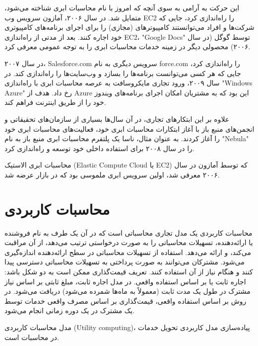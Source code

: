 \documentclass{book}
\begin{document}
            این حرکت به آرامی به سوی آنچه که امروز با نام محاسبات ابری شناخته می‌شود، متمایل شد. در سال ۲۰۰۶، آمازون سرویس وب EC2 را راه‌اندازی کرد، جایی که شرکت‌ها و افراد می‌توانستند کامپیوترهای (مجازی) را برای اجرای برنامه‌های کامپیوتری خود اجاره کنند. بعد از مدتی از راه‌اندازی EC2، "Google Docs" توسط گوگل (در سال ۲۰۰۶) محصولی دیگر در زمینه خدمات محاسبات ابری را به توجه عمومی معرفی کرد.

            در سال ۲۰۰۷، Salesforce.com سرویس دیگری به نام force.com را راه‌اندازی کرد، جایی که هر کسی می‌توانست برنامه‌ها را بسازد و وب‌سایت‌ها را راه‌اندازی کند. در سال ۲۰۰۹، ورود تجاری مایکروسافت به عرصه محاسبات ابری با راه‌اندازی "Windows Azure" رخ داد. هدف از Azure این بود که به مشتریان امکان اجرای برنامه‌های ویندوز خود را از طریق اینترنت فراهم کند.

            علاوه بر این ابتکارهای تجاری، در آن سال‌ها بسیاری از سازمان‌های تحقیقاتی و انجمن‌های منبع باز با آغاز ابتکارات محاسبات ابری خود، فعالیت‌های محاسبات ابری خود را آغاز کردند. به عنوان مثال، ناسا یک پلتفرم محاسبات ابری منبع باز به نام "Nebula" را در سال ۲۰۰۸ برای استفاده داخلی خود توسعه و راه‌اندازی کرد.

            \begin{addinfo}
                
                محاسبات ابری الاستیک (Elastic Compute Cloud یا EC2) که توسط آمازون در سال ۲۰۰۶ معرفی شد، اولین سرویس ابری ملموسی بود که در بازار عرضه شد.

            \end{addinfo}

        \section{محاسبات کاربردی}

            محاسبات کاربردی یک مدل تجاری محاسباتی است که در آن یک طرف به نام فروشنده یا ارائه‌دهنده، تسهیلات محاسباتی را به صورت درخواستی ترتیب می‌دهد، از آن مراقبت می‌کند، و ارائه می‌دهد. استفاده از تسهیلات محاسباتی در سطح ارائه‌دهنده اندازه‌گیری می‌شود. مشترکان می‌توانند به صورت پرداختی به تسهیلات محاسباتی دسترسی پیدا کنند و هنگام نیاز از آن استفاده کنند. تعریف قیمت‌گذاری ممکن است به دو شکل باشد: اجاره ثابت یا بر اساس استفاده واقعی. در مدل اجاره ثابت، مبلغ ثابتی بر اساس نیاز مشترک در طول یک مدت ثابت (معمولاً به ماه‌ها شمرده می‌شود) دریافت می‌شود. در روش بر اساس استفاده واقعی، قیمت‌گذاری بر اساس مصرف واقعی خدمات توسط یک مشترک در یک دوره زمانی انجام می‌شود.

            \begin{addinfo}
                
                مدل محاسبات کاربردی (Utility computing)، پیاده‌سازی مدل کاربردی تحویل خدمات در محاسبات است.

            \end{addinfo}
\end{document}
